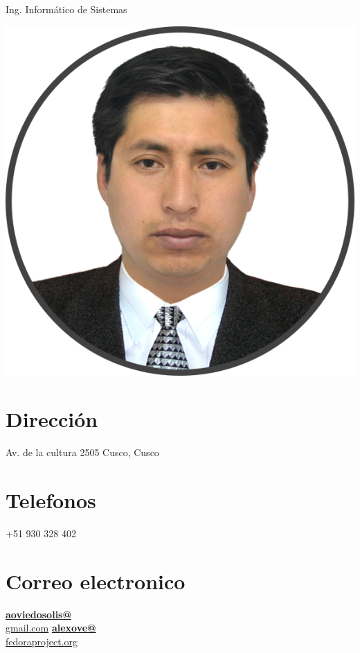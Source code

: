 \documentclass[]{friggeri-cv}
\begin{document}
{Ing. Inform\'atico de Sistemas}


\begin{aside}
    \includegraphics[scale=0.18]{img/aoviedo.png}
    \section{Direcci\'on}
    Av. de la cultura 2505
    Cusco, Cusco
    ~
    \section{Telefonos}
    +51 930 328 402
    ~
    \section{Correo electronico}
    \href{mailto:aoviedosolis@gmail.com}{\textbf{aoviedosolis@}\\gmail.com}
    \href{mailto:alexove@fedoraproject.org}{\textbf{alexove@}\\fedoraproject.org}
    ~

\end{aside}
\end{document}
